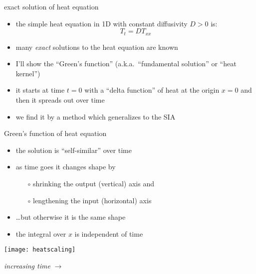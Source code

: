 \begin{frame}{exact solution of heat equation}

\begin{itemize}
\item the simple heat equation in 1D with constant diffusivity $D>0$ is:
	$$T_t = D T_{xx}$$
\item many \emph{exact} solutions to the heat equation are known
\item I'll show the ``Green's function'' (a.k.a.~``fundamental solution'' or ``heat kernel'')
\item it starts at time $t=0$ with a ``delta function'' of heat at the origin $x=0$ and then it spreads out over time
\item we find it by a method which generalizes to the SIA
\end{itemize}
\end{frame}


\begin{frame}{Green's function of heat equation}

\begin{itemize}
\item the solution is ``self-similar'' over time
\item as time goes it changes shape by
  \begin{itemize}
  \item[$\circ$] shrinking the output (vertical) axis and
  \item[$\circ$] lengthening the input (horizontal) axis
  \end{itemize}
\item \dots but otherwise it is the same shape
\item the integral over $x$ is independent of time
\end{itemize}

\begin{center}
\texttt{[image: heatscaling]}

\emph{increasing time} \Large $\to$
\end{center}
\end{frame}


